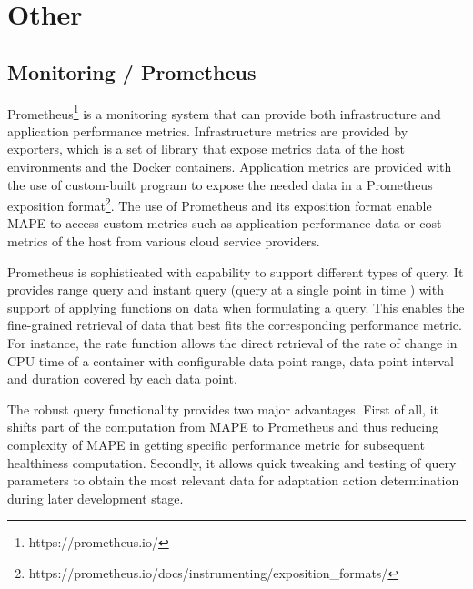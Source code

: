 \documentclass{seal_thesis}
\begin{document}
\section{Other}
\subsection{Monitoring / Prometheus}

Prometheus\footnote{https://prometheus.io/} is a monitoring system that can provide both infrastructure and application performance metrics.
Infrastructure metrics are provided by exporters, which is a set of library that expose metrics data of the host environments and the Docker containers.
Application metrics are provided with the use of custom-built program to expose the needed data in a Prometheus exposition format\footnote{https://prometheus.io/docs/instrumenting/exposition\_formats/}.
The use of Prometheus and its exposition format enable MAPE to access custom metrics such as application performance data or cost metrics of the host from various cloud service providers.

Prometheus is sophisticated with capability to support different types of query.
It provides range query and instant query (query at a single point in time \cite{prometheus_api}) with support of applying functions on data when formulating a query.
This enables the fine-grained retrieval of data that best fits the corresponding performance metric.
For instance, the rate function allows the direct retrieval of the rate of change in CPU time of a container with configurable data point range, data point interval and duration covered by each data point.

The robust query functionality provides two major advantages.
First of all, it shifts part of the computation from MAPE to Prometheus and thus reducing complexity of MAPE in getting specific performance metric for subsequent healthiness computation.
Secondly, it allows quick tweaking and testing of query parameters to obtain the most relevant data for adaptation action determination during later development stage. 
\end{document}
